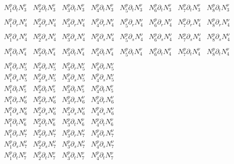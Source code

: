 \begin{tiny}
\[\begin{array}{cccccccc}
N_1^p\partial_t N_3^\upnu & N_2^p\partial_t N_3^\upnu & N_3^p\partial_t N_3^\upnu & N_4^p\partial_t N_3^\upnu &
N_5^p\partial_t N_3^\upnu & N_6^p\partial_t N_3^\upnu & N_7^p\partial_t N_3^\upnu & N_8^p\partial_t N_3^\upnu \\
\\
N_1^p\partial_r N_4^\upnu & N_2^p\partial_r N_4^\upnu & N_3^p\partial_r N_4^\upnu & N_4^p\partial_r N_4^\upnu &
N_5^p\partial_r N_4^\upnu & N_6^p\partial_r N_4^\upnu & N_7^p\partial_r N_4^\upnu & N_8^p\partial_r N_4^\upnu \\ \\
N_1^p\partial_s N_4^\upnu & N_2^p\partial_s N_4^\upnu & N_3^p\partial_s N_4^\upnu & N_4^p\partial_s N_4^\upnu &
N_5^p\partial_s N_4^\upnu & N_6^p\partial_s N_4^\upnu & N_7^p\partial_s N_4^\upnu & N_8^p\partial_s N_4^\upnu \\ \\
N_1^p\partial_t N_4^\upnu & N_2^p\partial_t N_4^\upnu & N_3^p\partial_t N_4^\upnu & N_4^p\partial_t N_4^\upnu &
N_5^p\partial_t N_4^\upnu & N_6^p\partial_t N_4^\upnu & N_7^p\partial_t N_4^\upnu & N_8^p\partial_t N_4^\upnu \\
\\
N_1^p\partial_r N_5^\upnu & N_2^p\partial_r N_5^\upnu & N_3^p\partial_r N_5^\upnu & N_4^p\partial_r N_5^\upnu \\
N_1^p\partial_s N_5^\upnu & N_2^p\partial_s N_5^\upnu & N_3^p\partial_s N_5^\upnu & N_4^p\partial_s N_5^\upnu \\
N_1^p\partial_t N_5^\upnu & N_2^p\partial_t N_5^\upnu & N_3^p\partial_t N_5^\upnu & N_4^p\partial_t N_5^\upnu \\
N_1^p\partial_r N_6^\upnu & N_2^p\partial_r N_6^\upnu & N_3^p\partial_r N_6^\upnu & N_4^p\partial_r N_6^\upnu \\
N_1^p\partial_s N_6^\upnu & N_2^p\partial_s N_6^\upnu & N_3^p\partial_s N_6^\upnu & N_4^p\partial_s N_6^\upnu \\
N_1^p\partial_t N_6^\upnu & N_2^p\partial_t N_6^\upnu & N_3^p\partial_t N_6^\upnu & N_4^p\partial_t N_6^\upnu \\
N_1^p\partial_r N_7^\upnu & N_2^p\partial_r N_7^\upnu & N_3^p\partial_r N_7^\upnu & N_4^p\partial_r N_7^\upnu \\
N_1^p\partial_s N_7^\upnu & N_2^p\partial_s N_7^\upnu & N_3^p\partial_s N_7^\upnu & N_4^p\partial_s N_7^\upnu \\
N_1^p\partial_t N_7^\upnu & N_2^p\partial_t N_7^\upnu & N_3^p\partial_t N_7^\upnu & N_4^p\partial_t N_7^\upnu \\

\end{array}\]
\end{tiny}
